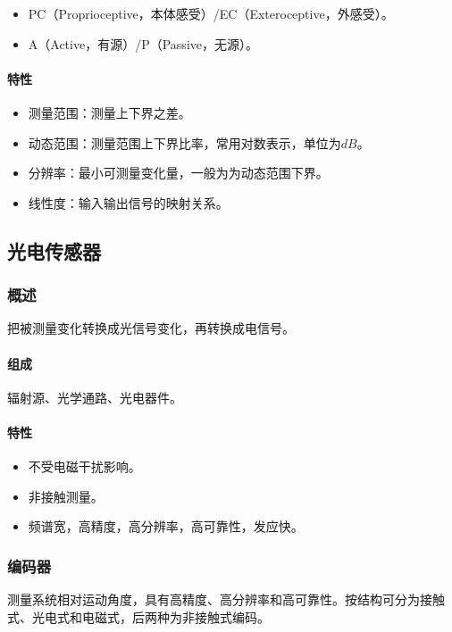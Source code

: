 \documentclass[
12pt, %
a4paper, 
oneside, %
headinclude,footinclude, %
]{scrartcl}
\begin{document}
\begin{itemize}
\item PC（Proprioceptive，本体感受）/EC（Exteroceptive，外感受）。
\item A（Active，有源）/P（Passive，无源）。
\end{itemize}
\paragraph{特性}
\begin{itemize}
\item 测量范围：测量上下界之差。    
\item 动态范围：测量范围上下界比率，常用对数表示，单位为$ dB $。
\item 分辨率：最小可测量变化量，一般为为动态范围下界。
\item 线性度：输入输出信号的映射关系。
\end{itemize}
\subsection[光电传感器]{光电传感器}
\subsubsection[概述]{概述}
把被测量变化转换成光信号变化，再转换成电信号。
\paragraph{组成}
辐射源、光学通路、光电器件。
\paragraph{特性}
\begin{itemize}
\item 不受电磁干扰影响。
\item 非接触测量。
\item 频谱宽，高精度，高分辨率，高可靠性，发应快。
\end{itemize}
\subsubsection[编码器]{编码器}
测量系统相对运动角度，具有高精度、高分辨率和高可靠性。按结构可分为接触式、光电式和电磁式，后两种为非接触式编码。
\end{document}
